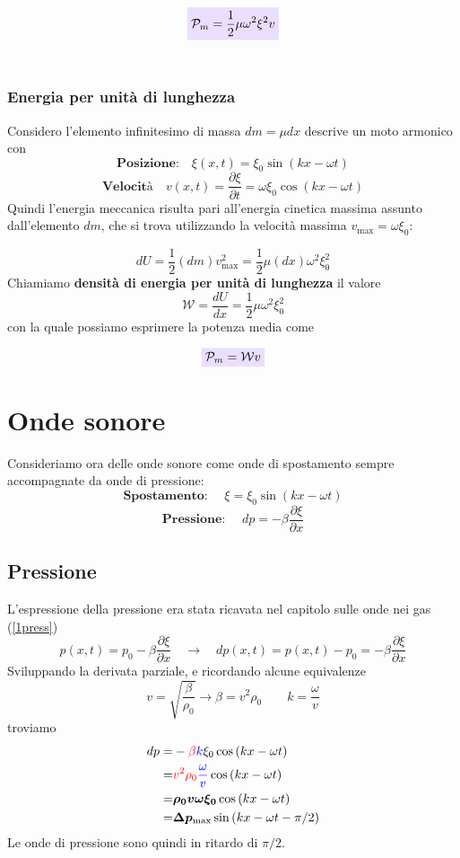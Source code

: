 \documentclass[x11names]{report}
\newcommand{\viola}[1]{\colorbox{yred}{$\displaystyle #1$}}
\begin{document}
	\vspace{0.2cm}
	\begin{equation}
		\viola{\mathcal{P}_m = \frac{1}{2}\mu\omega^2\xi^2v}
	\end{equation}
	\\
	
	\subsubsection{Energia per unità di lunghezza}
	Considero l'elemento infinitesimo di massa \(dm = \mu dx \) descrive un moto armonico con 
	\[ 
	\textbf{Posizione:} \quad \xi(x,t) = \xi_0\sin\left(kx - \omega t\right) 
	\]
	\[ 
	\textbf{Velocità} \quad v(x,t)= \frac{\partial\xi}{\partial t} = \omega \xi_0\cos\left(kx - \omega t\right) 
	\]
	Quindi l'energia meccanica risulta pari all'energia cinetica massima assunto dall'elemento \(dm\), che si trova utilizzando la velocità massima \(v_{\text{max}} = \omega \xi_0\):
	
	\[ 
	dU = \frac{1}{2}(dm)v_{\text{max}}^2 = \frac{1}{2}\mu(dx)\omega^2 \xi_0^2 
	\]
	Chiamiamo \textbf{densità di energia per unità di lunghezza} il valore 
	\[
	\mathcal{W} = \frac{dU}{dx} = \frac{1}{2}\mu \omega^2\xi_0^2
	\]
	con la quale possiamo esprimere la potenza media come 
	
	\begin{equation}
		\viola{\mathcal{P}_m = \mathcal{W} v}
	\end{equation}
	
	\section{Onde sonore}\label{Onde Sonore}
	Consideriamo ora delle onde sonore come onde di spostamento sempre accompagnate da onde di pressione:
	\[ 
	\textbf{Spostamento: }\quad \xi = \xi _0\sin(kx-\omega t)
	\]
	\[ 
	\textbf{Pressione: }\quad dp = -\beta \frac{\partial\xi}{\partial x}
	\]
	\subsection{Pressione}
	L'espressione della pressione era stata ricavata nel capitolo sulle onde nei gas (\ref{1press})
	\[ 
	p(x,t) = p_0 -\beta \frac{\partial \xi }{\partial x} \quad \to \quad dp(x,t) = p(x,t) - p_0 = -\beta \frac{\partial \xi }{\partial x}
	\]
	Sviluppando la derivata parziale, e ricordando alcune equivalenze
	\[ 
	\boxed{v = \sqrt{\frac{\beta}{\rho_0}} \to  \beta = v^2\rho_0} \qquad \boxed{k = \frac{\omega }{v}}
	\]
	troviamo
	\begin{align*}
		dp =& -\textcolor{red}{\beta} \textcolor{blue}{k} \xi_0 \cos\left(kx-\omega t\right) \\
		=& \textcolor{red}{v^2 \rho_0}\textcolor{blue}{\frac{\omega }{v}} \cos\left(kx-\omega t\right) \\
		=& \boldsymbol{\rho_0 v \omega  \xi_0}  \cos\left(kx-\omega t\right) \\ 
		=& \boldsymbol{\Delta p_{\text{max}}} \sin\left(kx -\omega t - \pi /2\right) \\
	\end{align*}
	Le onde di pressione sono quindi in ritardo di \(\pi /2\).
	
\end{document}
